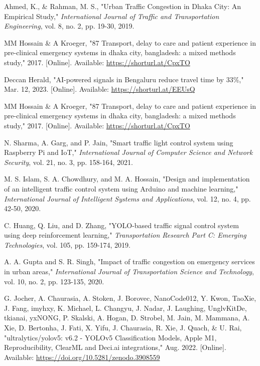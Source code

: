 \begin{thebibliography}{99}
Ahmed, K., \& Rahman, M. S., "Urban Traffic Congestion in Dhaka City: An Empirical Study," \textit{International Journal of Traffic and Transportation Engineering}, vol. 8, no. 2, pp. 19-30, 2019.

MM Hossain \& A Kroeger, "87 Transport, delay to care and patient experience in pre-clinical emergency systems in dhaka city, bangladesh: a mixed methods study," 2017. [Online]. Available: \url{https://shorturl.at/CpxTO}

Deccan Herald, "AI-powered signals in Bengaluru reduce travel time by 33\%," Mar. 12, 2023. [Online]. Available: \url{https://shorturl.at/EEUsQ}

MM Hossain \& A Kroeger, "87 Transport, delay to care and patient experience in pre-clinical emergency systems in dhaka city, bangladesh: a mixed methods study," 2017. [Online]. Available: \url{https://shorturl.at/CpxTO}

N. Sharma, A. Garg, and P. Jain, "Smart traffic light control system using Raspberry Pi and IoT," \textit{International Journal of Computer Science and Network Security}, vol. 21, no. 3, pp. 158-164, 2021.

M. S. Islam, S. A. Chowdhury, and M. A. Hossain, "Design and implementation of an intelligent traffic control system using Arduino and machine learning," \textit{International Journal of Intelligent Systems and Applications}, vol. 12, no. 4, pp. 42-50, 2020.

C. Huang, Q. Liu, and D. Zhang, "YOLO-based traffic signal control system using deep reinforcement learning," \textit{Transportation Research Part C: Emerging Technologies}, vol. 105, pp. 159-174, 2019.

A. A. Gupta and S. R. Singh, "Impact of traffic congestion on emergency services in urban areas," \textit{International Journal of Transportation Science and Technology}, vol. 10, no. 2, pp. 123-135, 2020.

G. Jocher, A. Chaurasia, A. Stoken, J. Borovec, NanoCode012, Y. Kwon, TaoXie, J. Fang, imyhxy, K. Michael, L. Changyu, J. Nadar, J. Laughing, UnglvKitDe, tkianai, yxNONG, P. Skalski, A. Hogan, D. Strobel, M. Jain, M. Mammana, A. Xie, D. Bertonha, J. Fati, X. Yifu, J. Chaurasia, R. Xie, J. Quach, \& U. Rai, "ultralytics/yolov5: v6.2 - YOLOv5 Classification Models, Apple M1, Reproducibility, ClearML and Deci.ai integrations," Aug. 2022. [Online]. Available: \url{https://doi.org/10.5281/zenodo.3908559}


\end{thebibliography}

